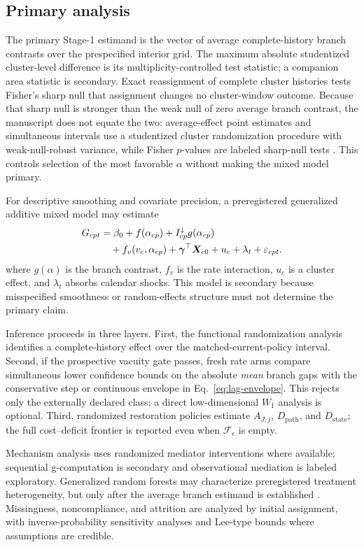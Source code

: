 \documentclass[pdflatex,sn-mathphys-num]{sn-jnl}
\begin{document}
\subsection{Primary analysis}

The primary Stage-1 estimand is the vector of average complete-history branch contrasts over the prespecified interior grid. The maximum absolute studentized cluster-level difference is its multiplicity-controlled test statistic; a companion area statistic is secondary. Exact reassignment of complete cluster histories tests Fisher's sharp null that assignment changes no cluster-window outcome. Because that sharp null is stronger than the weak null of zero average branch contrast, the manuscript does not equate the two: average-effect point estimates and simultaneous intervals use a studentized cluster randomization procedure with weak-null-robust variance, while Fisher $p$-values are labeled sharp-null tests \cite{wu2021randomization}. This controls selection of the most favorable $\alpha$ without making the mixed model primary.

For descriptive smoothing and covariate precision, a preregistered generalized additive mixed model may estimate
\begin{align}
G_{cpt}
  &=\beta_0+f(\alpha_{cp})+I_{cp}^{\downarrow}g(\alpha_{cp}) \notag\\
  &\quad +f_v(v_c,\alpha_{cp})+\bm\gamma^\top\bm X_{c0}
  +u_c+\lambda_t+\varepsilon_{cpt}.
\end{align}
where $g(\alpha)$ is the branch contrast, $f_v$ is the rate interaction, $u_c$ is a cluster effect, and $\lambda_t$ absorbs calendar shocks. This model is secondary because misspecified smoothness or random-effects structure must not determine the primary claim.

Inference proceeds in three layers. First, the functional randomization analysis identifies a complete-history effect over the matched-current-policy interval. Second, if the prospective vacuity gate passes, fresh rate arms compare simultaneous lower confidence bounds on the absolute \emph{mean} branch gaps with the conservative step or continuous envelope in Eq.~\eqref{eq:lag-envelope}. This rejects only the externally declared class; a direct low-dimensional $W_1$ analysis is optional. Third, randomized restoration policies estimate $A_{J,j}$, $D_{\mathrm{path}}$, and $D_{\mathrm{state}}$; the full cost--deficit frontier is reported even when $\mathcal F_\epsilon$ is empty.

Mechanism analysis uses randomized mediator interventions where available; sequential g-computation is secondary and observational mediation is labeled exploratory. Generalized random forests may characterize preregistered treatment heterogeneity, but only after the average branch estimand is established \cite{athey2019forests}. Missingness, noncompliance, and attrition are analyzed by initial assignment, with inverse-probability sensitivity analyses and Lee-type bounds where assumptions are credible.
\end{document}
